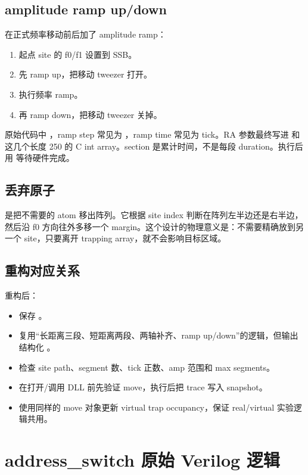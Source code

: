 \documentclass[11pt,oneside,openany]{book}
\begin{document}
\section{amplitude ramp up/down}
 在正式频率移动前后加了 amplitude ramp：
\begin{enumerate}
  \item 起点 site 的 f0/f1 设置到 SSB。
  \item 先 ramp up，把移动 tweezer 打开。
  \item 执行频率 ramp。
  \item 再 ramp down，把移动 tweezer 关掉。
\end{enumerate}
原始代码中 ，ramp step 常见为 ，ramp time 常见为  tick。RA 参数最终写进  和  这几个长度 250 的 C int array。section 是累计时间，不是每段 duration。执行后用  等待硬件完成。

\section{丢弃原子}
 是把不需要的 atom 移出阵列。它根据 site index 判断在阵列左半边还是右半边，然后沿 f0 方向往外多移一个 margin。这个设计的物理意义是：不需要精确放到另一个 site，只要离开 trapping array，就不会影响目标区域。

\section{重构对应关系}
重构后：
\begin{itemize}
  \item {} 保存 。
  \item {} 复用“长距离三段、短距离两段、两轴补齐、ramp up/down”的逻辑，但输出结构化 。
  \item {} 检查 site path、segment 数、tick 正数、amp 范围和 max segments。
  \item {} 在打开/调用 DLL 前先验证 move，执行后把  trace 写入 snapshot。
  \item {} 使用同样的 move 对象更新 virtual trap occupancy，保证 real/virtual 实验逻辑共用。
\end{itemize}

\chapter{address\_switch 原始 Verilog 逻辑}
\end{document}
